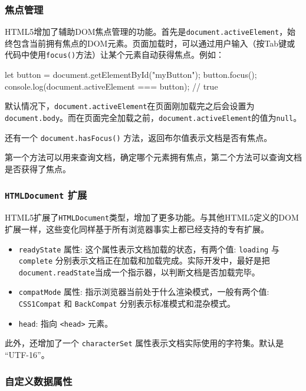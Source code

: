 \subsubsection*{焦点管理}

HTML5增加了辅助DOM焦点管理的功能。首先是\texttt{document.activeElement}，始终包含当前拥有焦点的DOM元素。页面加载时，可以通过用户输入（按Tab键或代码中使用\texttt{focus()}方法）让某个元素自动获得焦点。例如：

\begin{JavaScript}
let button = document.getElementById("myButton"); 
button.focus(); 
console.log(document.activeElement === button); // true 
\end{JavaScript}

默认情况下，\texttt{document.activeElement}在页面刚加载完之后会设置为\texttt{document.body}。而在页面完全加载之前，\texttt{document.activeElement}的值为\texttt{null}。

还有一个 \texttt{document.hasFocus()} 方法，返回布尔值表示文档是否有焦点。

第一个方法可以用来查询文档，确定哪个元素拥有焦点，第二个方法可以查询文档是否获得了焦点。

\subsubsection*{\texttt{HTMLDocument} 扩展}

HTML5扩展了\texttt{HTMLDocument}类型，增加了更多功能。与其他HTML5定义的DOM扩展一样，这些变化同样基于所有浏览器事实上都已经支持的专有扩展。

\begin{itemize}
    \item \texttt{readyState} 属性: 这个属性表示文档加载的状态，有两个值: \texttt{loading} 与 \texttt{complete} 分别表示文档正在加载和加载完成。实际开发中，最好是把\texttt{document.readState}当成一个指示器，以判断文档是否加载完毕。
    \item \texttt{compatMode} 属性: 指示浏览器当前处于什么渲染模式，一般有两个值: \texttt{CSS1Compat} 和 \texttt{BackCompat} 分别表示标准模式和混杂模式。
    \item \texttt{head}: 指向 \texttt{<head>} 元素。
\end{itemize}

此外，还增加了一个 \texttt{characterSet} 属性表示文档实际使用的字符集。默认是 ``UTF-16''。

\subsubsection*{自定义数据属性}

